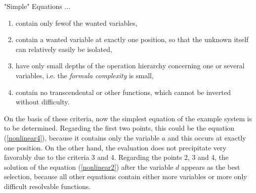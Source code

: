\noindent "Simple" Equations $\dots$
\begin{enumerate}
\item contain only fewof  the wanted variables,
\item contain a wanted variable at exactly one position, so that the unknown itself can relatively easily be isolated,
\item 
 have only small depths of the operation hierarchy concerning one or several variables, i.e. the {\em formula complexity} is small,
\item contain no transcendental or other functions, which cannot  be inverted without difficulty.
\end{enumerate}

On the basis of these criteria, now the simplest equation of the example system is to be determined. 
Regarding the first two points, this could be the equation  (\ref{nonlinear4}), because it contains only the variable $a$ and this occurs at exactly one position. On the other hand, the evaluation does not precipitate very favorably due to the criteria 3 and 4. Regarding the points 2, 3 and 4, the solution of the equation  (\ref{nonlinear2}) after the variable $d$ appears as the best selection, because all other equations contain either more variables or more only difficult resolvable functions.


